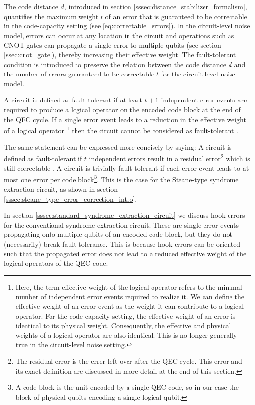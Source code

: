 The code distance $d$, introduced in section \ref{sssec:distance_stabilizer_formalism},
quantifies the maximum weight $t$ of an error that is guaranteed to be correctable in the code-capacity setting (see \eqref{eq:correctable_errors}).
In the circuit-level noise model, errors can occur at any location in the circuit and operations 
such as CNOT gates can propagate a single error to multiple qubits (see section \ref{ssec:cnot_gate}), thereby increasing their effective weight.
The fault-tolerant condition is introduced to preserve the relation between the code distance $d$ and the number of errors guaranteed to be correctable $t$ for the circuit-level noise model.

A circuit is defined as fault-tolerant if at least $t+1$ independent error events are required to produce a logical operator on the encoded code block at the end of the QEC cycle.
If a single error event leads to a reduction in the effective weight of a logical operator
\footnote{
    Here, the term effective weight of the logical operator refers to the minimal number of independent error events required to realize it.
    We can define the effective weight of an error event as the weight it can contribute to a logical operator. 
    For the code-capacity setting, the effective weight of an error is identical to its physical weight. 
    Consequently, the effective and physical weights of a logical operator are also identical.
    This is no longer generally true in the circuit-level noise setting. 
} then the circuit cannot be considered as fault-tolerant \cite{friederike_steane,gottesmann_book}.

The same statement can be expressed more concisely by saying:
A circuit is defined as fault-tolerant if $t$ independent errors result in a residual error\footnote{
    The residual error is the error left over after the QEC cycle.
    This error and its exact definition are discussed in more detail at the end of this section. 
} which is still correctable \cite{gottesmann_book}.
A circuit is trivially fault-tolerant if each error event leads to at most one error per code block\footnote{A code block is the unit encoded by a single QEC code, so in our case the block of physical qubits encoding a single logical qubit.}.
This is the case for the Steane-type syndrome extraction circuit, as shown in section \ref{sssec:steane_type_error_correction_intro}. 

In section \ref{sssec:standard_syndrome_extraction_circuit} we discuss hook errors for the conventional syndrome extraction circuit. 
These are single error events propagating onto multiple qubits of an encoded code block, but they do not (necessarily) break fault tolerance.
This is because hook errors can be oriented such that the propagated error does not lead to a reduced effective weight of the logical operators of the QEC code.

